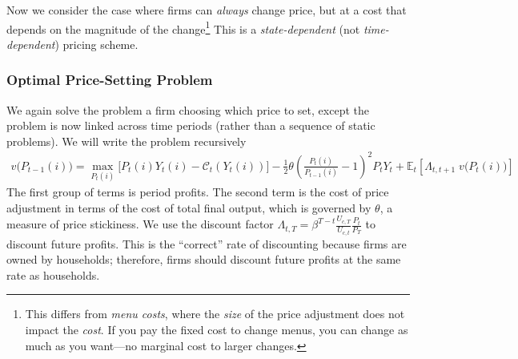 \documentclass[12pt]{article}
\theoremstyle{plain}
\theoremstyle{definition}
\theoremstyle{remark}
\newcommand{\calC}{\mathcal{C}}
\newcommand{\E}{\mathbb{E}}
\begin{document}
Now we consider the case where firms can \emph{always} change price, but
at a cost that depends on the magnitude of the change\footnote{%
  This differs from \emph{menu costs}, where the \emph{size} of the
  price adjustment does not impact the \emph{cost}.
  If you pay the fixed cost to change menus, you can change as much
  as you want---no marginal cost to larger changes.
}
This is a \emph{state-dependent} (not \emph{time-dependent}) pricing
scheme.


\subsubsection{Optimal Price-Setting Problem}


We again solve the problem a firm choosing which price to set, except
the problem is now linked across time periods (rather than a sequence of
static problems). We will write the problem recursively
\begin{align*}
  v\big(P_{t-1}(i)\big)
  =
  \max_{P_t(i)}
  \big[
  P_t(i)Y_t(i) - \calC_t(Y_t(i))
  \big]
  - \frac{1}{2}\theta
  \left(
  \frac{P_t(i)}{P_{t-1}(i)}-1
  \right)^2 P_tY_t
  + \E_t\left[\Lambda_{t,t+1}\;v\big(P_t(i)\big)\right]
\end{align*}
The first group of terms is period profits.  The second term is the
cost of price adjustment in terms of the cost of total final output,
which is governed by $\theta$, a measure of price stickiness.
We use the discount factor $\Lambda_{t,T}=\beta^{T-t}
\frac{U_{c,T}}{U_{c,t}}\frac{P_t}{P_T}$ to discount future profits.
This is the ``correct'' rate of discounting because firms are owned
by households; therefore, firms should discount future profits at
the same rate as households.
\end{document}
